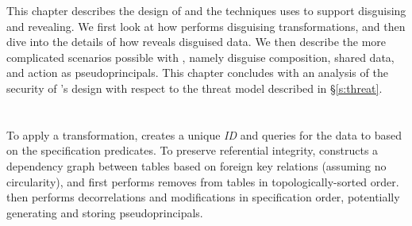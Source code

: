 This chapter describes the design of \sys and the techniques \sys uses to
support disguising and revealing. We first look at how \sys performs disguising
transformations, and then dive into the details of how \sys reveals disguised
data.
We then describe the more complicated scenarios possible with \sys, namely disguise composition, shared
data, and action as pseudoprincipals.
This chapter concludes with an analysis of the security of \sys's design with
respect to the threat model described in \S\ref{s:threat}.

\section{\Xxing}
\label{s:applying}

To apply a \xxing transformation, \sys creates a unique \emph{\xx ID} and
queries for the data to \xx based on the \xx specification predicates.
%
To preserve referential integrity, \sys constructs a dependency graph between
tables based on foreign key relations (assuming no circularity), and first
performs removes from tables in topologically-sorted order.  \sys then performs
decorrelations and modifications in specification order, potentially generating
and storing pseudoprincipals.
%

%
%

